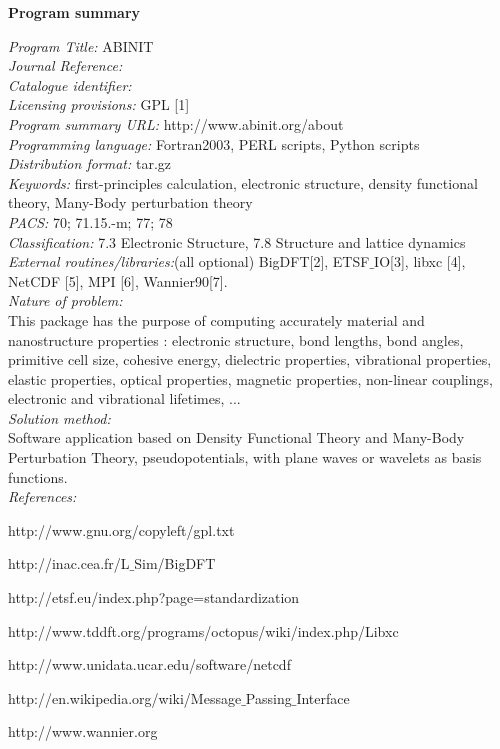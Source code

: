 \documentclass{elsart}
\newcounter{bla}
\newenvironment{refnummer}{%
\list{[\arabic{bla}]}%
{\usecounter{bla}%
 \setlength{\itemindent}{0pt}%
 \setlength{\topsep}{0pt}%
 \setlength{\itemsep}{0pt}%
 \setlength{\labelsep}{2pt}%
 \setlength{\listparindent}{0pt}%
 \settowidth{\labelwidth}{[9]}%
 \setlength{\leftmargin}{\labelwidth}%
 \addtolength{\leftmargin}{\labelsep}%
 \setlength{\rightmargin}{0pt}}}
 {\endlist}
\begin{document}
{\bf Program summary}

\begin{small}
\noindent
{\em Program Title:} ABINIT                                  \\
{\em Journal Reference:}                                       \\
{\em Catalogue identifier:}                                    \\
{\em Licensing provisions:} GPL [1]                           \\
{\em Program summary URL:} http://www.abinit.org/about \\
{\em Programming language:} Fortran2003, PERL scripts, Python scripts     \\
{\em Distribution format:} tar.gz                              \\
{\em Keywords:}  first-principles calculation, electronic structure, density functional theory, Many-Body perturbation theory\\
{\em PACS:} 70; 71.15.-m; 77; 78                             \\
{\em Classification:} 7.3  Electronic Structure, 7.8 Structure and lattice dynamics \\
{\em External routines/libraries:}(all optional) BigDFT[2], ETSF$\_$IO[3], libxc [4], NetCDF [5], MPI [6], Wannier90[7].  \\

{\em Nature of problem:} \\
  This package has the purpose of computing accurately material and nanostructure properties : 
  electronic structure, bond lengths, bond angles, primitive
  cell size, cohesive energy, dielectric properties, vibrational properties, elastic properties, optical properties, 
  magnetic properties, non-linear couplings, electronic and vibrational lifetimes,  ...
   \\
{\em Solution method:}\\
  Software application based on Density Functional Theory and Many-Body Perturbation Theory, pseudopotentials, with plane waves or wavelets as basis functions.
   \\
{\em References:}
\begin{refnummer}
\item http://www.gnu.org/copyleft/gpl.txt
\item http://inac.cea.fr/L$\_$Sim/BigDFT
\item http://etsf.eu/index.php?page=standardization
\item http://www.tddft.org/programs/octopus/wiki/index.php/Libxc
\item http://www.unidata.ucar.edu/software/netcdf
\item http://en.wikipedia.org/wiki/Message$\_$Passing$\_$Interface
\item http://www.wannier.org
\end{refnummer}

\end{small}
\end{document}
